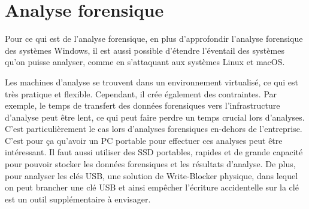 \section{Analyse forensique}

Pour ce qui est de l'analyse forensique, en plus d'approfondir l'analyse forensique des systèmes Windows, il est aussi possible d'étendre l'éventail des systèmes qu'on puisse analyser, comme en s'attaquant aux systèmes Linux et macOS.

Les machines d'analyse se trouvent dans un environnement virtualisé, ce qui est très pratique et flexible. Cependant, il crée également des contraintes. Par exemple, le temps de transfert des données forensiques vers l'infrastructure d'analyse peut être lent, ce qui peut faire perdre un temps crucial lors d'analyses. C'est particulièrement le cas lors d'analyses forensiques en-dehors de l'entreprise. C'est pour ça qu'avoir un PC portable pour effectuer ces analyses peut être intéressant. Il faut aussi utiliser des SSD portables, rapides et de grande capacité pour pouvoir stocker les données forensiques et les résultats d'analyse. De plus, pour analyser les clés USB, une solution de Write-Blocker physique, dans lequel on peut brancher une clé USB et ainsi empêcher l'écriture accidentelle sur la clé est un outil supplémentaire à envisager.


